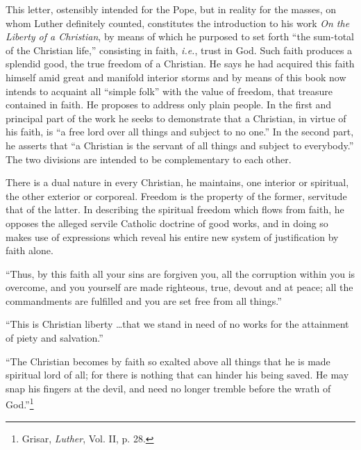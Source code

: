 This letter, ostensibly intended for the Pope, but in reality for the
masses, on whom Luther definitely counted, constitutes the introduction
to his work \textit{On the Liberty of a Christian}, by means of
which he purposed to set forth “the sum-total of the Christian life,”
consisting in faith, \textit{i.e.}, trust in God. Such faith produces a splendid
good, the true freedom of a Christian. He says he had acquired this
faith himself amid great and manifold interior storms and by means
of this book now intends to acquaint all “simple folk” with the value
of freedom, that treasure contained in faith. He proposes to address
only plain people. In the first and principal part of the work he seeks
to demonstrate that a Christian, in virtue of his faith, is “a free lord
over all things and subject to no one.” In the second part, he asserts
that “a Christian is the servant of all things and subject to everybody.”
The two divisions are intended to be complementary to each other.

There is a dual nature in every Christian, he maintains, one interior or
spiritual, the other exterior or corporeal. Freedom is the property of the
former, servitude that of the latter. In describing the spiritual freedom
which flows from faith, he opposes the alleged servile Catholic doctrine of
good works, and in doing so makes use of expressions which reveal his entire
new system of justification by faith alone.

“Thus, by this faith all your sins are forgiven you, all the corruption
within you is overcome, and you yourself are made righteous, true, devout
and at peace; all the commandments are fulfilled and you are set free from
all things.”

“This is Christian liberty \dots that we stand in need of no works for the
attainment of piety and salvation.”

“The Christian becomes by faith so exalted above all things that he is
made spiritual lord of all; for there is nothing that can hinder his being
saved. He may snap his fingers at the devil, and need no longer tremble
before the wrath of God.”\footnote{Grisar, \textit{Luther}, Vol. II, p. 28.}

